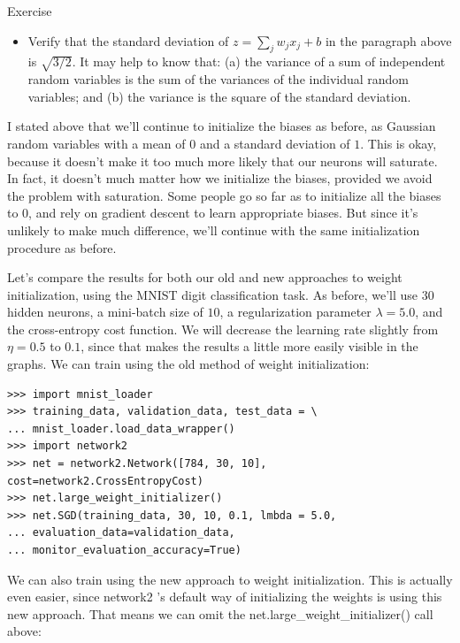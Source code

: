 \begin{exerciseBox}{Exercise}


\begin{itemize}

\item Verify that the standard deviation of $z = \sum_j w_j x_j + b$ in the paragraph above is $\sqrt{3/2}$. It may help to know that: (a) the variance of a sum of independent random variables is the sum of the variances of the individual random variables; and (b) the variance is the square of the standard deviation.

\end{itemize}


I stated above that we'll continue to initialize the biases as before, as Gaussian random variables with a mean of $0$ and a standard deviation of $1$. This is okay, because it doesn't make it too much more likely that our neurons will saturate. In fact, it doesn't much matter how we initialize the biases, provided we avoid the problem with saturation. Some people go so far as to initialize all the biases to $0$, and rely on gradient descent to learn appropriate biases. But since it's unlikely to make much difference, we'll continue with the same initialization procedure as before.


Let's compare the results for both our old and new approaches to weight initialization, using the MNIST digit classification task. As before, we'll use $30$ hidden neurons, a mini-batch size of $10$, a regularization parameter $\lambda = 5.0$, and the cross-entropy cost function. We will decrease the learning rate slightly from $\eta = 0.5$ to $0.1$, since that makes the results a little more easily visible in the graphs. We can train using the old method of weight initialization:



\begin{lstlisting}
>>> import mnist_loader
>>> training_data, validation_data, test_data = \
... mnist_loader.load_data_wrapper()
>>> import network2
>>> net = network2.Network([784, 30, 10], cost=network2.CrossEntropyCost)
>>> net.large_weight_initializer()
>>> net.SGD(training_data, 30, 10, 0.1, lmbda = 5.0,
... evaluation_data=validation_data, 
... monitor_evaluation_accuracy=True)

\end{lstlisting}


We can also train using the new approach to weight initialization. This is actually even easier, since network2 's default way of initializing the weights is using this new approach. That means we can omit the net.large\_\allowbreak{}weight\_\allowbreak{}initializer() call above:




\end{exerciseBox}
